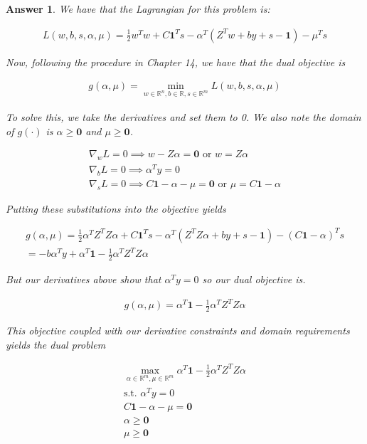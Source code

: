 \documentclass[12pt]{article}
\theoremstyle{colon}
\newtheorem*{answer}{Answer}
\begin{document}
\begin{answer}
  We have that the Lagrangian for this problem is:

  \begin{gather*}
    L(w, b, s, \alpha, \mu) = \frac{1}{2} w^T w + C \bm{1}^T s - \alpha^T (Z^T w + b y + s - \bm{1}) - \mu^T s
  \end{gather*}

   Now, following the procedure in Chapter 14, we have that the dual objective is

  \begin{gather*}
    g(\alpha, \mu) = \min_{w \in \mathbb{R}^n, b \in \mathbb{R}, s \in \mathbb{R}^m} L(w, b, s, \alpha, \mu)
  \end{gather*}

  To solve this, we take the derivatives and set them to 0. We also note the domain of $g(\cdot)$ is $\alpha \geq \bm{0}$ and $\mu \geq \bm{0}$.

  \begin{gather*}
    \nabla_w L = 0 \implies w - Z \alpha = \bm{0} \text{ or } w = Z \alpha\\
    \nabla_b L = 0 \implies \alpha^T y = 0 \\
    \nabla_s L = 0 \implies C \bm{1} - \alpha - \mu = \bm{0} \text{ or } \mu = C \bm{1} - \alpha
  \end{gather*}

  Putting these substitutions into the objective yields

  \begin{gather*}
    g(\alpha, \mu) = \frac{1}{2} \alpha^T Z^T Z \alpha + C \bm{1}^T s - \alpha^T (Z^T Z \alpha + by + s - \bm{1}) - (C \bm{1} - \alpha)^T s \\
    = -b \alpha^T y + \alpha^T \bm{1} -\frac{1}{2} \alpha^T Z^T Z \alpha
  \end{gather*}

  But our derivatives above show that $\alpha^T y = 0$ so our dual objective is.

  \begin{gather*}
    g(\alpha, \mu) = \alpha^T \bm{1} -\frac{1}{2} \alpha^T Z^T Z \alpha
  \end{gather*}

  This objective coupled with our derivative constraints and domain requirements yields the dual problem

  \begin{gather*}
    \max_{\alpha \in \mathbb{R}^m, \mu \in \mathbb{R}^m} \alpha^T \bm{1} -\frac{1}{2} \alpha^T Z^T Z \alpha \\
    \text{s.t. } \alpha^T y = 0 \\
    C \bm{1} - \alpha - \mu = \bm{0} \\
    \alpha \geq \bm{0} \\
    \mu \geq \bm{0}
  \end{gather*}


\end{answer}
\end{document}
